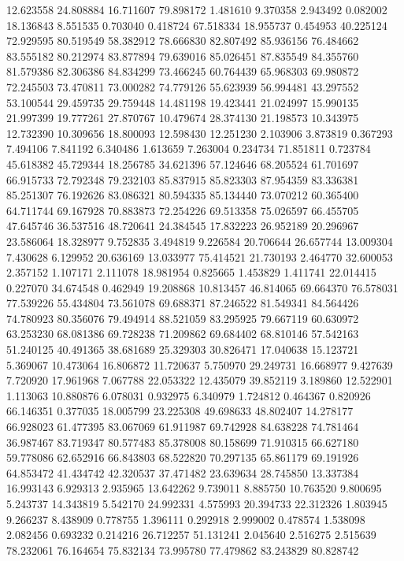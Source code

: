 12.623558
24.808884
16.711607
79.898172
1.481610
9.370358
2.943492
0.082002
18.136843
8.551535
0.703040
0.418724
67.518334
18.955737
0.454953
40.225124
72.929595
80.519549
58.382912
78.666830
82.807492
85.936156
76.484662
83.555182
80.212974
83.877894
79.639016
85.026451
87.835549
84.355760
81.579386
82.306386
84.834299
73.466245
60.764439
65.968303
69.980872
72.245503
73.470811
73.000282
74.779126
55.623939
56.994481
43.297552
53.100544
29.459735
29.759448
14.481198
19.423441
21.024997
15.990135
21.997399
19.777261
27.870767
10.479674
28.374130
21.198573
10.343975
12.732390
10.309656
18.800093
12.598430
12.251230
2.103906
3.873819
0.367293
7.494106
7.841192
6.340486
1.613659
7.263004
0.234734
71.851811
0.723784
45.618382
45.729344
18.256785
34.621396
57.124646
68.205524
61.701697
66.915733
72.792348
79.232103
85.837915
85.823303
87.954359
83.336381
85.251307
76.192626
83.086321
80.594335
85.134440
73.070212
60.365400
64.711744
69.167928
70.883873
72.254226
69.513358
75.026597
66.455705
47.645746
36.537516
48.720641
24.384545
17.832223
26.952189
20.296967
23.586064
18.328977
9.752835
3.494819
9.226584
20.706644
26.657744
13.009304
7.430628
6.129952
20.636169
13.033977
75.414521
21.730193
2.464770
32.600053
2.357152
1.107171
2.111078
18.981954
0.825665
1.453829
1.411741
22.014415
0.227070
34.674548
0.462949
19.208868
10.813457
46.814065
69.664370
76.578031
77.539226
55.434804
73.561078
69.688371
87.246522
81.549341
84.564426
74.780923
80.356076
79.494914
88.521059
83.295925
79.667119
60.630972
63.253230
68.081386
69.728238
71.209862
69.684402
68.810146
57.542163
51.240125
40.491365
38.681689
25.329303
30.826471
17.040638
15.123721
5.369067
10.473064
16.806872
11.720637
5.750970
29.249731
16.668977
9.427639
7.720920
17.961968
7.067788
22.053322
12.435079
39.852119
3.189860
12.522901
1.113063
10.880876
6.078031
0.932975
6.340979
1.724812
0.464367
0.820926
66.146351
0.377035
18.005799
23.225308
49.698633
48.802407
14.278177
66.928023
61.477395
83.067069
61.911987
69.742928
84.638228
74.781464
36.987467
83.719347
80.577483
85.378008
80.158699
71.910315
66.627180
59.778086
62.652916
66.843803
68.522820
70.297135
65.861179
69.191926
64.853472
41.434742
42.320537
37.471482
23.639634
28.745850
13.337384
16.993143
6.929313
2.935965
13.642262
9.739011
8.885750
10.763520
9.800695
5.243737
14.343819
5.542170
24.992331
4.575993
20.394733
22.312326
1.803945
9.266237
8.438909
0.778755
1.396111
0.292918
2.999002
0.478574
1.538098
2.082456
0.693232
0.214216
26.712257
51.131241
2.045640
2.516275
2.515639
78.232061
76.164654
75.832134
73.995780
77.479862
83.243829
80.828742
